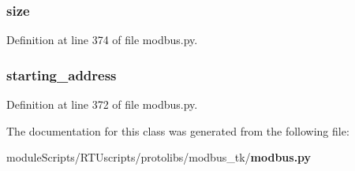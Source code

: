 \subsubsection[{size}]{\setlength{\rightskip}{0pt plus 5cm}size}\label{classprotolibs_1_1modbus__tk_1_1modbus_1_1_modbus_block_aa3d6656320f1a7278c0c2c7fdf07617c}


Definition at line 374 of file modbus.\+py.

\subsubsection[{starting\+\_\+address}]{\setlength{\rightskip}{0pt plus 5cm}starting\+\_\+address}\label{classprotolibs_1_1modbus__tk_1_1modbus_1_1_modbus_block_a7c88eba1f515bdd4530d5f5c376bc347}


Definition at line 372 of file modbus.\+py.



The documentation for this class was generated from the following file\+:\begin{DoxyCompactItemize}
\item 
module\+Scripts/\+R\+T\+Uscripts/protolibs/modbus\+\_\+tk/{\bf modbus.\+py}\end{DoxyCompactItemize}
